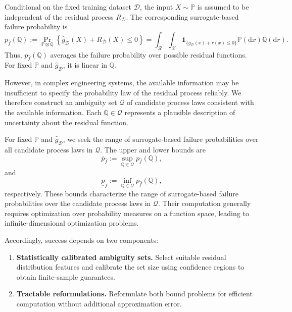 \documentclass[review,11pt,3p,authoryear,nopreprintline]{elsarticle}
\begin{document}
Conditional on the fixed training dataset $\mathcal{D}$, the input $X\sim\mathbb{P}$ is assumed to be independent of the residual process $R_{\mathcal{D}}$. The corresponding surrogate-based failure probability is
\begin{equation} 
    p_{\hat{f}}(\mathbb{Q}) 
    := \Pr_{\mathbb{P}\otimes\mathbb{Q}}
       \left\{
         \hat{g}_{\mathcal{D}}(X)+R_{\mathcal{D}}(X)\leq 0
       \right\} 
    = \int_{\mathcal{R}}
         \int_{\mathcal{X}}
         \mathbf{1}_{\{
           \hat{g}_{\mathcal{D}}(x)+r(x)\leq 0
         \}}
         \mathbb{P}(\mathrm{d}x)
       \mathbb{Q}(\mathrm{d}r). 
\end{equation}
Thus, $p_{\hat{f}}(\mathbb{Q})$ averages the failure probability over possible residual functions. For fixed $\mathbb{P}$ and $\hat{g}_{\mathcal{D}}$, it is linear in $\mathbb{Q}$.

However, in complex engineering systems, the available information may be insufficient to specify the probability law of the residual process reliably. We therefore construct an ambiguity set $\mathscr{Q}$ of candidate process laws consistent with the available information. Each $\mathbb{Q}\in\mathscr{Q}$ represents a plausible description of uncertainty about the residual function.

For fixed $\mathbb{P}$ and $\hat{g}_{\mathcal{D}}$, we seek the range of surrogate-based failure probabilities over all candidate process laws in $\mathscr{Q}$. The upper
and lower bounds are
\begin{equation}
  \overline{p}_{\hat{f}}
  := \sup_{\mathbb{Q}\in\mathscr{Q}}
     p_{\hat{f}}(\mathbb{Q}),
  \label{eq-upper-bound}
\end{equation}
and
\begin{equation}
  \underline{p}_{\hat{f}}
  := \inf_{\mathbb{Q}\in\mathscr{Q}}
     p_{\hat{f}}(\mathbb{Q}),
  \label{eq-lower-bound}
\end{equation}
respectively. These bounds characterize the range of surrogate-based failure probabilities over the candidate process laws in $\mathscr{Q}$. Their computation generally requires optimization over probability measures on a function space, leading to infinite-dimensional optimization problems.

Accordingly, success depends on two components:
\begin{enumerate}
  \item \textbf{Statistically calibrated ambiguity sets.} Select suitable residual distribution features and calibrate the set size using confidence regions to obtain finite-sample guarantees.
  \item \textbf{Tractable reformulations.} Reformulate both bound problems for efficient computation without additional approximation error.
\end{enumerate}
\end{document}
